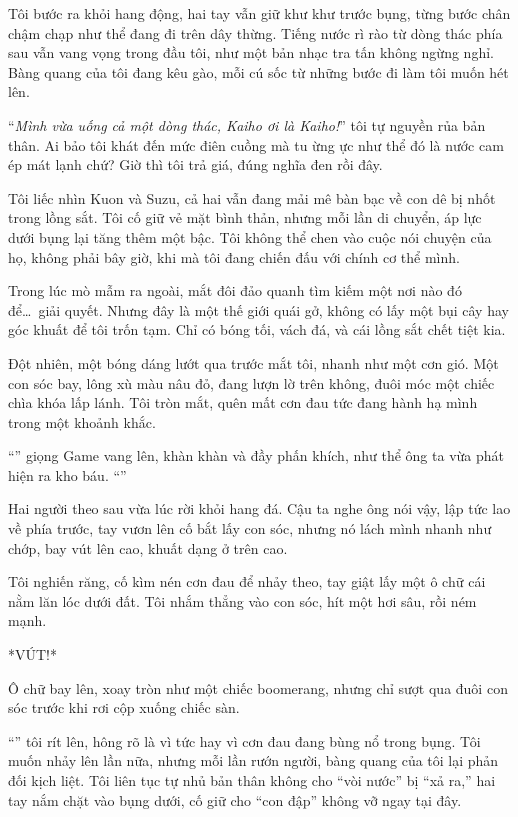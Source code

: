 \documentclass[../main.tex]{subfiles}
\begin{document}
Tôi bước ra khỏi hang động, hai tay vẫn giữ khư khư trước bụng, từng bước chân chậm chạp như thể đang đi trên dây thừng. Tiếng nước rì rào từ dòng thác phía sau vẫn vang vọng trong đầu tôi, như một bản nhạc tra tấn không ngừng nghỉ. Bàng quang của tôi đang kêu gào, mỗi cú sốc từ những bước đi làm tôi muốn hét lên.

``\textit{Mình vừa uống cả một dòng thác, Kaiho ơi là Kaiho!}'' tôi tự nguyền rủa bản thân. Ai bảo tôi khát đến mức điên cuồng mà tu ừng ực như thể đó là nước cam ép mát lạnh chứ? Giờ thì tôi trả giá, đúng nghĩa đen rồi đây.

Tôi liếc nhìn Kuon và Suzu, cả hai vẫn đang mải mê bàn bạc về con dê bị nhốt trong lồng sắt. Tôi cố giữ vẻ mặt bình thản, nhưng mỗi lần di chuyển, áp lực dưới bụng lại tăng thêm một bậc. Tôi không thể chen vào cuộc nói chuyện của họ, không phải bây giờ, khi mà tôi đang chiến đấu với chính cơ thể mình.

Trong lúc mò mẫm ra ngoài, mắt đôi đảo quanh tìm kiếm một nơi nào đó để\dots\ giải quyết. Nhưng đây là một thế giới quái gở, không có lấy một bụi cây hay góc khuất để tôi trốn tạm. Chỉ có bóng tối, vách đá, và cái lồng sắt chết tiệt kia.

Đột nhiên, một bóng dáng lướt qua trước mắt tôi, nhanh như một cơn gió. Một con sóc bay, lông xù màu nâu đỏ, đang lượn lờ trên không, đuôi móc một chiếc chìa khóa lấp lánh. Tôi tròn mắt, quên mất cơn đau tức đang hành hạ mình trong một khoảnh khắc.


``\textbf{}'' giọng Game vang lên, khàn khàn và đầy phấn khích, như thể ông ta vừa phát hiện ra kho báu. ``''

Hai người theo sau vừa lúc rời khỏi hang đá. Cậu ta nghe ông nói vậy, lập tức lao về phía trước, tay vươn lên cố bắt lấy con sóc, nhưng nó lách mình nhanh như chớp, bay vút lên cao, khuất dạng ở trên cao.

Tôi nghiến răng, cố kìm nén cơn đau để nhảy theo, tay giật lấy một ô chữ cái nằm lăn lóc dưới đất. Tôi nhắm thẳng vào con sóc, hít một hơi sâu, rồi ném mạnh.

*VÚT!*

Ô chữ bay lên, xoay tròn như một chiếc boomerang, nhưng chỉ sượt qua đuôi con sóc trước khi rơi cộp xuống chiếc sàn.

``'' tôi rít lên, hông rõ là vì tức hay vì cơn đau đang bùng nổ trong bụng. Tôi muốn nhảy lên lần nữa, nhưng mỗi lần rướn người, bàng quang của tôi lại phản đối kịch liệt. Tôi liên tục tự nhủ bản thân không cho ``vòi nước'' bị ``xả ra,'' hai tay nắm chặt vào bụng dưới, cố giữ cho ``con đập'' không vỡ ngay tại đây.
\end{document}
